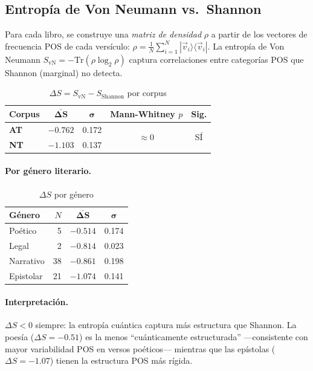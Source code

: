\documentclass[12pt,a4paper]{article}
\newcommand{\ot}{\textcolor{otcolor}{\textbf{AT}}}
\newcommand{\nt}{\textcolor{ntcolor}{\textbf{NT}}}
\newcommand{\val}[1]{\textcolor{hlcolor}{\textbf{#1}}}
\begin{document}
\subsection{Entrop\'ia de Von Neumann vs.\ Shannon}

Para cada libro, se construye una \emph{matriz de densidad} $\rho$ a partir de los vectores
de frecuencia POS de cada vers\'iculo: $\rho = \frac{1}{N} \sum_{i=1}^{N} |\vec{v}_i\rangle\langle\vec{v}_i|$.
La entrop\'ia de Von Neumann $S_{\text{vN}} = -\text{Tr}(\rho \log_2 \rho)$ captura correlaciones
entre categor\'ias POS que Shannon (marginal) no detecta.

\begin{table}[H]
\centering
\caption{$\Delta S = S_{\text{vN}} - S_{\text{Shannon}}$ por corpus}
\label{tab:deltavn}
\begin{tabular}{lcccc}
\toprule
\textbf{Corpus} & $\boldsymbol{\bar{\Delta S}}$ & $\boldsymbol{\sigma}$ & \textbf{Mann-Whitney $p$} & \textbf{Sig.} \\
\midrule
\ot{}     & \val{$-0.762$} & 0.172 & \multirow{2}{*}{$\approx 0$} & \multirow{2}{*}{S\'I} \\
\nt{}     & \val{$-1.103$} & 0.137 & & \\
\bottomrule
\end{tabular}
\end{table}

\paragraph{Por g\'enero literario.}
\begin{table}[H]
\centering
\caption{$\Delta S$ por g\'enero}
\label{tab:deltavngenre}
\begin{tabular}{lrcc}
\toprule
\textbf{G\'enero} & $N$ & $\boldsymbol{\bar{\Delta S}}$ & $\boldsymbol{\sigma}$ \\
\midrule
Po\'etico   & 5  & \val{$-0.514$} & 0.174 \\
Legal       & 2  & $-0.814$ & 0.023 \\
Narrativo   & 38 & $-0.861$ & 0.198 \\
Epistolar   & 21 & \val{$-1.074$} & 0.141 \\
\bottomrule
\end{tabular}
\end{table}

\paragraph{Interpretaci\'on.}
$\Delta S < 0$ siempre: la entrop\'ia cu\'antica captura m\'as estructura que Shannon.
La poes\'ia ($\Delta S = -0.51$) es la menos ``cu\'anticamente estructurada'' ---consistente
con mayor variabilidad POS en versos po\'eticos--- mientras que las ep\'istolas ($\Delta S = -1.07$)
tienen la estructura POS m\'as r\'igida.
\end{document}

